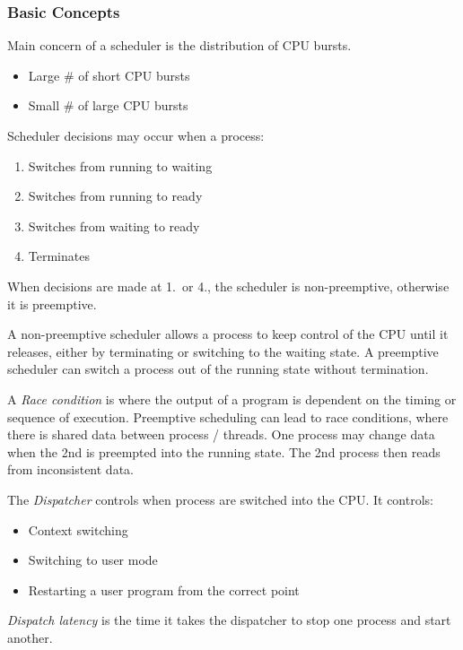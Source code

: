 \subsubsection{Basic Concepts}

Main concern of a scheduler is the distribution of CPU bursts.\
\begin{itemize}
    \item Large \# of short CPU bursts
    \item Small \# of large CPU bursts
\end{itemize}


Scheduler decisions may occur when a process:
\begin{enumerate}
    \item Switches from running to waiting
    \item Switches from running to ready
    \item Switches from waiting to ready
    \item Terminates
\end{enumerate}

When decisions are made at 1.\ or 4., the scheduler is
non-preemptive, otherwise it is preemptive.

A non-preemptive scheduler allows a process to keep control of the CPU
until it releases, either by terminating or switching to the waiting state.
A preemptive scheduler can switch a process out of the running state without termination.

A \textit{Race condition} is where the output of a program is dependent on the timing
or sequence of execution. Preemptive scheduling can lead to race conditions, where there is shared 
data between process / threads. One process may change data when the 2nd is preempted into the running state.
The 2nd process then reads from inconsistent data.

The \textit{Dispatcher} controls when process are switched into the CPU.
It controls:
\begin{itemize}
    \item Context switching
    \item Switching to user mode
    \item Restarting a user program from the correct point
\end{itemize}

\textit{Dispatch latency} is the time it takes the dispatcher to stop one
process and start another.